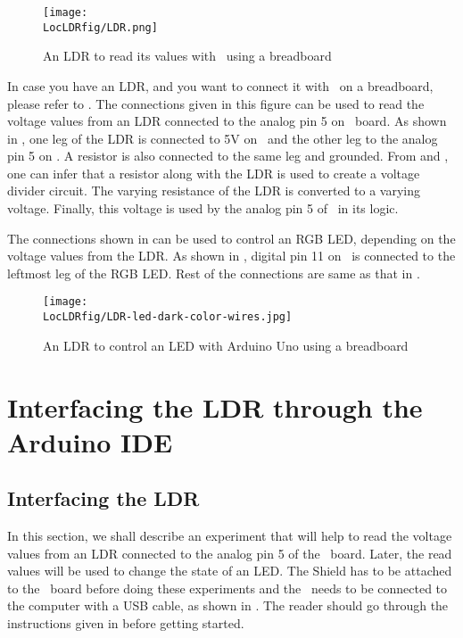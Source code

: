 \begin{figure}
  \centering
  \texttt{[image: \\LocLDRfig/LDR.png]}
  \caption{An LDR to read its values with \arduino\ using a breadboard}
  \label{fig:ard-ldr}
\end{figure}

In case you have an LDR, and you want to connect it with \arduino\ on a breadboard, 
please refer to . The connections given in this figure can be 
used to read the voltage values from an LDR connected to the analog pin 5 on 
\arduino\ board. As shown in , one leg of the LDR is connected 
to 5V on \arduino\ and the other leg to the analog pin 5 on \arduino. A resistor is also connected to the same leg and grounded. 
From  and , one can infer that a resistor 
along with the LDR is used to create a voltage divider circuit. The varying 
resistance of the LDR is converted to a varying voltage. Finally, this voltage is used 
by the analog pin 5 of \arduino\ in its logic. 

The connections shown in  can be used to control an RGB LED, 
depending on the voltage values from the LDR. As shown in , 
digital pin 11 on \arduino\ is connected to the leftmost leg of the RGB LED. Rest of the connections
are same as that in . 

\begin{figure}
  \centering
  \texttt{[image: \\LocLDRfig/LDR-led-dark-color-wires.jpg]}
  \caption{An LDR to control an LED with Arduino Uno using a breadboard}
  \label{fig:ard-ldr-led}
\end{figure}


\section{Interfacing the LDR through the Arduino IDE}
\subsection{Interfacing the LDR}
In this section, we shall describe an experiment that will help 
to read the voltage values from an LDR connected to the analog pin 5 
of the \arduino\ board. Later, the read values will be used to change the state of an LED.  The Shield has to be attached to the \arduino\ board
before doing these experiments and the \arduino\ needs to be connected to the computer 
with a USB cable, as shown in . The reader should go through the
instructions given in  before getting started.

